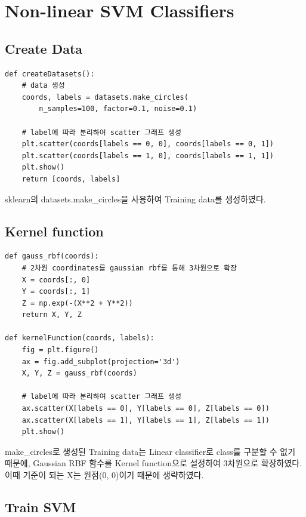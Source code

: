 \documentclass[]{report}
\begin{document}
\section{Non-linear SVM Classifiers}

\subsection{Create Data}

\begin{lstlisting}
def createDatasets():
	# data 생성
	coords, labels = datasets.make_circles(
		n_samples=100, factor=0.1, noise=0.1)

	# label에 따라 분리하여 scatter 그래프 생성
	plt.scatter(coords[labels == 0, 0], coords[labels == 0, 1])
	plt.scatter(coords[labels == 1, 0], coords[labels == 1, 1])
	plt.show()
	return [coords, labels]
\end{lstlisting}

sklearn의 datasets.make\_circles을 사용하여 Training data를 생성하였다. 


\subsection{Kernel function}

\begin{lstlisting}
def gauss_rbf(coords):
	# 2차원 coordinates를 gaussian rbf를 통해 3차원으로 확장
	X = coords[:, 0]
	Y = coords[:, 1]
	Z = np.exp(-(X**2 + Y**2))
	return X, Y, Z

def kernelFunction(coords, labels):
	fig = plt.figure()
	ax = fig.add_subplot(projection='3d')
	X, Y, Z = gauss_rbf(coords)

	# label에 따라 분리하여 scatter 그래프 생성
	ax.scatter(X[labels == 0], Y[labels == 0], Z[labels == 0])
	ax.scatter(X[labels == 1], Y[labels == 1], Z[labels == 1])
	plt.show()
\end{lstlisting}

make\_circles로 생성된 Training data는 Linear classifier로 class를 구분할 수 없기 때문에,
Gaussian RBF 함수를 Kernel function으로 설정하여 3차원으로 확장하였다. 
이때 기준이 되는 X는 원점(0, 0)이기 때문에 생략하였다.  \\



\subsection{Train SVM}
\end{document}
